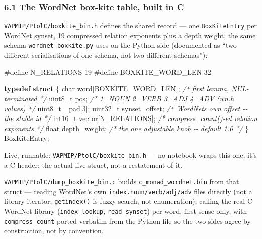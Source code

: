 \documentclass[
  10pt,
]{article}
\newenvironment{Shaded}{}{}
\newcommand{\CommentTok}[1]{\textcolor[rgb]{0.38,0.63,0.69}{\textit{#1}}}
\newcommand{\DataTypeTok}[1]{\textcolor[rgb]{0.56,0.13,0.00}{#1}}
\newcommand{\DecValTok}[1]{\textcolor[rgb]{0.25,0.63,0.44}{#1}}
\newcommand{\KeywordTok}[1]{\textcolor[rgb]{0.00,0.44,0.13}{\textbf{#1}}}
\newcommand{\NormalTok}[1]{#1}
\newcommand{\OperatorTok}[1]{\textcolor[rgb]{0.40,0.40,0.40}{#1}}
\newcommand{\PreprocessorTok}[1]{\textcolor[rgb]{0.74,0.48,0.00}{#1}}
\begin{document}
\hypertarget{the-wordnet-box-kite-table-built-in-c}{%
\subsubsection{6.1 The WordNet box-kite table, built in
C}\label{the-wordnet-box-kite-table-built-in-c}}

\texttt{VAPMIP/PtolC/boxkite\_bin.h} defines the shared record --- one
\texttt{BoxKiteEntry} per WordNet synset, 19 compressed relation
exponents plus a depth weight, the same schema
\texttt{wordnet\_boxkite.py} uses on the Python side (documented as
``two different serialisations of one schema, not two different
schemas''):

\begin{Shaded}
\begin{Highlighting}[]
\PreprocessorTok{\#define N\_RELATIONS       }\DecValTok{19}
\PreprocessorTok{\#define BOXKITE\_WORD\_LEN  }\DecValTok{32}

\KeywordTok{typedef} \KeywordTok{struct} \OperatorTok{\{}
    \DataTypeTok{char}\NormalTok{     word}\OperatorTok{[}\NormalTok{BOXKITE\_WORD\_LEN}\OperatorTok{];}  \CommentTok{/* first lemma, NUL{-}terminated */}
    \DataTypeTok{uint8\_t}\NormalTok{  pos}\OperatorTok{;}                     \CommentTok{/* 1=NOUN 2=VERB 3=ADJ 4=ADV (wn.h values) */}
    \DataTypeTok{uint8\_t}\NormalTok{  \_pad}\OperatorTok{[}\DecValTok{3}\OperatorTok{];}
    \DataTypeTok{uint32\_t}\NormalTok{ synset\_offset}\OperatorTok{;}           \CommentTok{/* WordNet\textquotesingle{}s own offset {-}{-} the stable id */}
    \DataTypeTok{int16\_t}\NormalTok{  vector}\OperatorTok{[}\NormalTok{N\_RELATIONS}\OperatorTok{];}     \CommentTok{/* compress\_count(){-}ed relation exponents */}
    \DataTypeTok{float}\NormalTok{    depth\_weight}\OperatorTok{;}            \CommentTok{/* the one adjustable knob {-}{-} default 1.0 */}
\OperatorTok{\}}\NormalTok{ BoxKiteEntry}\OperatorTok{;}
\end{Highlighting}
\end{Shaded}

Live, runnable: \texttt{VAPMIP/PtolC/boxkite\_bin.h} --- no notebook
wraps this one, it's a C header; the actual live struct, not a
restatement of it.

\texttt{VAPMIP/PtolC/dump\_boxkite\_bin.c} builds
\texttt{c\_monad\_wordnet.bin} from that struct --- reading WordNet's
own \texttt{index.noun/verb/adj/adv} files directly (not a library
iterator; \texttt{getindex()} is fuzzy search, not enumeration), calling
the real C WordNet library (\texttt{index\_lookup},
\texttt{read\_synset}) per word, first sense only, with
\texttt{compress\_count} ported verbatim from the Python file so the two
sides agree by construction, not by convention.
\end{document}
